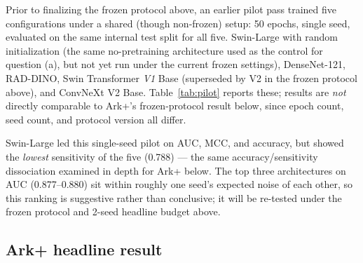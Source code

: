 \documentclass[11pt]{article}
\begin{document}
Prior to finalizing the frozen protocol above, an earlier pilot pass trained five configurations under a shared (though non-frozen) setup: 50 epochs, single seed, evaluated on the same internal test split for all five. Swin-Large with random initialization (the same no-pretraining architecture used as the control for question (a), but not yet run under the current frozen settings), DenseNet-121, RAD-DINO, Swin Transformer \emph{V1} Base (superseded by V2 in the frozen protocol above), and ConvNeXt V2 Base. Table~\ref{tab:pilot} reports these; results are \emph{not} directly comparable to Ark+'s frozen-protocol result below, since epoch count, seed count, and protocol version all differ.

\begin{table}[h]
\centering
\caption{Preliminary pilot comparison, non-frozen protocol (50 epochs, 1 seed, shared internal test split). Not comparable to Table~\ref{tab:results}.}
\label{tab:pilot}
\end{table}

Swin-Large led this single-seed pilot on AUC, MCC, and accuracy, but showed the \emph{lowest} sensitivity of the five (0.788) --- the same accuracy/sensitivity dissociation examined in depth for Ark+ below. The top three architectures on AUC (0.877--0.880) sit within roughly one seed's expected noise of each other, so this ranking is suggestive rather than conclusive; it will be re-tested under the frozen protocol and 2-seed headline budget above.

\subsection*{Ark+ headline result}
\end{document}
